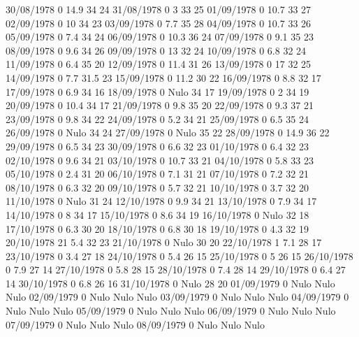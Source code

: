 30/08/1978  0      14.9   34     24 
31/08/1978  0      3      33     25 
01/09/1978  0      10.7   33     27 
02/09/1978  0      10     34     23 
03/09/1978  0      7.7    35     28 
04/09/1978  0      10.7   33     26 
05/09/1978  0      7.4    34     24 
06/09/1978  0      10.3   36     24 
07/09/1978  0      9.1    35     23 
08/09/1978  0      9.6    34     26 
09/09/1978  0      13     32     24 
10/09/1978  0      6.8    32     24 
11/09/1978  0      6.4    35     20 
12/09/1978  0      11.4   31     26 
13/09/1978  0      17     32     25 
14/09/1978  0      7.7    31.5   23 
15/09/1978  0      11.2   30     22 
16/09/1978  0      8.8    32     17 
17/09/1978  0      6.9    34     16 
18/09/1978  0     Nulo    34     17 
19/09/1978  0      2      34     19 
20/09/1978  0      10.4   34     17 
21/09/1978  0      9.8    35     20 
22/09/1978  0      9.3    37     21 
23/09/1978  0      9.8    34     22 
24/09/1978  0      5.2    34     21 
25/09/1978  0      6.5    35     24 
26/09/1978  0     Nulo    34     24 
27/09/1978  0     Nulo    35     22 
28/09/1978  0      14.9   36     22 
29/09/1978  0      6.5    34     23 
30/09/1978  0      6.6    32     23 
01/10/1978  0      6.4    32     23 
02/10/1978  0      9.6    34     21 
03/10/1978  0      10.7   33     21 
04/10/1978  0      5.8    33     23 
05/10/1978  0      2.4    31     20 
06/10/1978  0      7.1    31     21 
07/10/1978  0      7.2    32     21 
08/10/1978  0      6.3    32     20 
09/10/1978  0      5.7    32     21 
10/10/1978  0      3.7    32     20 
11/10/1978  0     Nulo    31     24 
12/10/1978  0      9.9    34     21 
13/10/1978  0      7.9    34     17 
14/10/1978  0      8      34     17 
15/10/1978  0      8.6    34     19 
16/10/1978  0     Nulo    32     18 
17/10/1978  0      6.3    30     20 
18/10/1978  0      6.8    30     18 
19/10/1978  0      4.3    32     19 
20/10/1978  21     5.4    32     23 
21/10/1978  0     Nulo    30     20 
22/10/1978  1      7.1    28     17 
23/10/1978  0      3.4    27     18 
24/10/1978  0      5.4    26     15 
25/10/1978  0      5      26     15 
26/10/1978  0      7.9    27     14 
27/10/1978  0      5.8    28     15 
28/10/1978  0      7.4    28     14 
29/10/1978  0      6.4    27     14 
30/10/1978  0      6.8    26     16 
31/10/1978  0     Nulo    28     20 
01/09/1979  0     Nulo   Nulo   Nulo
02/09/1979  0     Nulo   Nulo   Nulo
03/09/1979  0     Nulo   Nulo   Nulo
04/09/1979  0     Nulo   Nulo   Nulo
05/09/1979  0     Nulo   Nulo   Nulo
06/09/1979  0     Nulo   Nulo   Nulo
07/09/1979  0     Nulo   Nulo   Nulo
08/09/1979  0     Nulo   Nulo   Nulo
